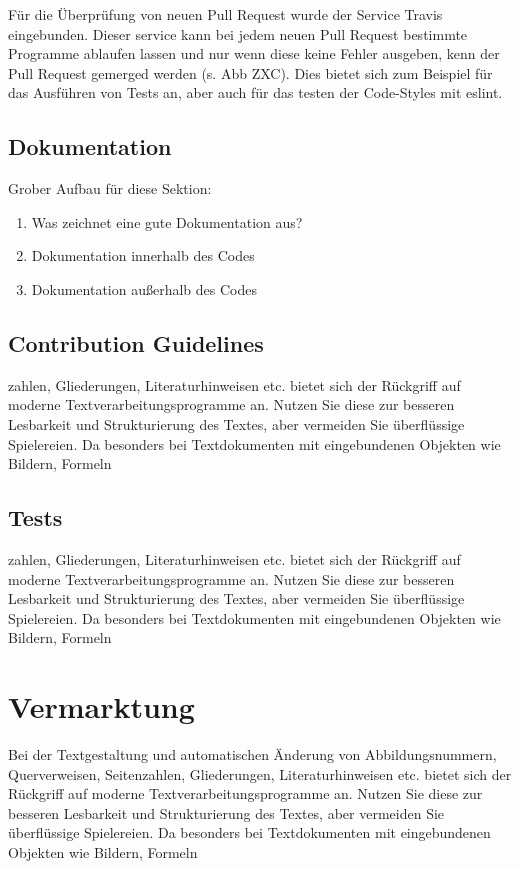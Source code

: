 Für die Überprüfung von neuen Pull Request wurde der Service Travis eingebunden. Dieser service kann bei jedem neuen Pull Request bestimmte Programme ablaufen lassen und nur wenn diese keine Fehler ausgeben, kenn der Pull Request gemerged werden (s. Abb ZXC). Dies bietet sich zum Beispiel für das Ausführen von Tests an, aber auch für das testen der Code-Styles mit eslint.

\subsection{Dokumentation}
Grober Aufbau für diese Sektion:

\begin{enumerate}
  \item Was zeichnet eine gute Dokumentation aus?
  \item Dokumentation innerhalb des Codes
  \item Dokumentation außerhalb des Codes
\end{enumerate}


\subsection{Contribution Guidelines}
zahlen, Gliederungen, Literaturhinweisen etc. bietet sich der Rückgriff
auf moderne Textverarbeitungsprogramme an. Nutzen Sie diese zur besseren Lesbarkeit
und Strukturierung des Textes, aber vermeiden Sie überflüssige Spielereien. Da
besonders bei Textdokumenten mit eingebundenen Objekten wie Bildern, Formeln

\subsection{Tests}
zahlen, Gliederungen, Literaturhinweisen etc. bietet sich der Rückgriff
auf moderne Textverarbeitungsprogramme an. Nutzen Sie diese zur besseren Lesbarkeit
und Strukturierung des Textes, aber vermeiden Sie überflüssige Spielereien. Da
besonders bei Textdokumenten mit eingebundenen Objekten wie Bildern, Formeln

\section{Vermarktung}
Bei der Textgestaltung und automatischen Änderung von Abbildungsnummern, Querverweisen,
Seitenzahlen, Gliederungen, Literaturhinweisen etc. bietet sich der Rückgriff
auf moderne Textverarbeitungsprogramme an. Nutzen Sie diese zur besseren Lesbarkeit
und Strukturierung des Textes, aber vermeiden Sie überflüssige Spielereien. Da
besonders bei Textdokumenten mit eingebundenen Objekten wie Bildern, Formeln
